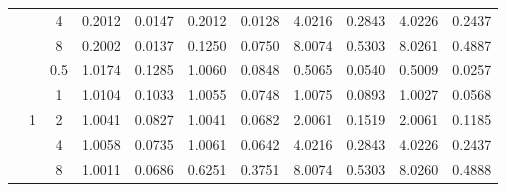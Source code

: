 \documentclass[12pt, catalan]{article}
\numberwithin{table}{section}
\numberwithin{figure}{section}
\numberwithin{equation}{section}
\begin{document}
\begin{table}[htb]
\begin{tabular}{c|c|c||cc|cc||cc|cc}
													&& 4 & 0.2012 & 0.0147 & 0.2012 & 0.0128 & 4.0216 & 0.2843 & 4.0226 & 0.2437\\
													&& 8 & 0.2002 & 0.0137 & 0.1250 & 0.0750 & 8.0074 & 0.5303 & 8.0261 & 0.4887\\\cline{2-11} & \multirow{5}{*}{1}
													& 0.5 & 1.0174 & 0.1285 & 1.0060 & 0.0848 & 0.5065 & 0.0540 & 0.5009 & 0.0257\\
													&& 1 & 1.0104 & 0.1033 & 1.0055 & 0.0748 & 1.0075 & 0.0893 & 1.0027 & 0.0568\\
													&& 2 & 1.0041 & 0.0827 & 1.0041 & 0.0682 & 2.0061 & 0.1519 & 2.0061 & 0.1185\\
													&& 4 & 1.0058 & 0.0735 & 1.0061 & 0.0642 & 4.0216 & 0.2843 & 4.0226 & 0.2437\\
													&& 8 & 1.0011 & 0.0686 & 0.6251 & 0.3751 & 8.0074 & 0.5303 & 8.0260 & 0.4888
	\end{tabular}
	\label{tab:resultats}
\end{table}
\end{document}
